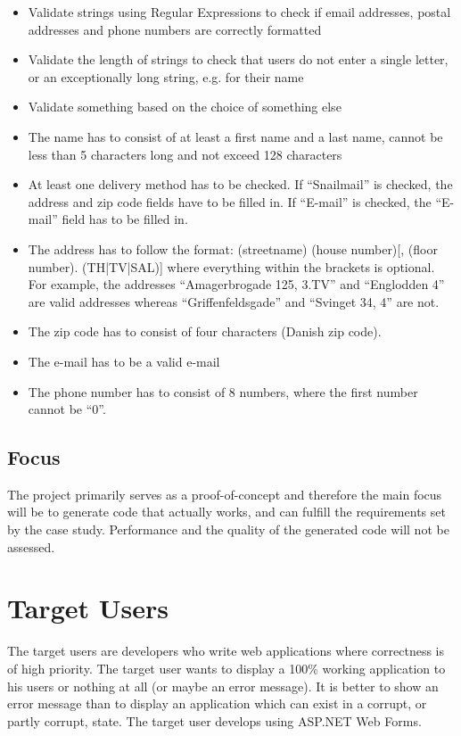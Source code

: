 		\begin{itemize}
		\item Validate strings using Regular Expressions to check if email addresses, postal addresses and phone numbers are correctly formatted
		\item Validate the length of strings to check that users do not enter a single letter, or an exceptionally long string, e.g. for their name
		\item Validate something based on the choice of something else

		\item The name has to consist of at least a first name and a last name, cannot be less than 5 characters long and not exceed 128 characters
		\item At least one delivery method has to be checked. If “Snailmail” is checked, the address and zip code fields have to be filled in. If “E-mail” is checked, the “E-mail” field has to be filled in.
		\item The address has to follow the format: (streetname) (house number)[, (floor number). (TH|TV|SAL)] where everything within the brackets is optional. For example, the addresses “Amagerbrogade 125, 3.TV” and “Englodden 4” are valid addresses whereas “Griffenfeldsgade” and “Svinget 34, 4” are not.
		\item The zip code has to consist of four characters (Danish zip code).
		\item The e-mail has to be a valid e-mail
		\item The phone number has to consist of 8 numbers, where the first number cannot be “0”.
		\end{itemize}

	\subsection{Focus}
		The project primarily serves as a proof-of-concept and therefore the main focus will be to generate code that actually works, and can fulfill the requirements set by the case study. Performance and the quality of the generated code will not be assessed.

\section{Target Users}
	The target users are developers who write web applications where correctness is of high priority. The target user wants to display a 100\% working application to his users or nothing at all (or maybe an error message). It is better to show an error message than to display an application which can exist in a corrupt, or partly corrupt, state. The target user develops using ASP.NET Web Forms.


